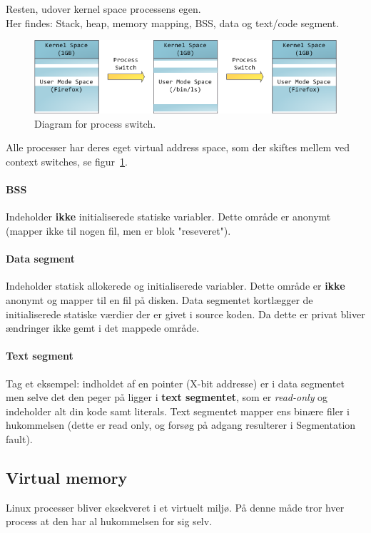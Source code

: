 Resten, udover kernel space processens egen.\\

Her findes: Stack, heap, memory mapping, BSS, data og text/code segment.

\begin{figure}[H]
	\centering
	\includegraphics[width=\linewidth]{figs/memoryspace}
	\caption{Diagram for process switch.}
	\label{fig:memoryspace}
\end{figure}

Alle processer har deres eget virtual address space, som der skiftes mellem ved context switches, se figur~\ref{fig:memoryspace}.

\paragraph{BSS}
Indeholder \textbf{ikke} initialiserede statiske variabler. Dette område er anonymt (mapper ikke til nogen fil, men er blok "reseveret").

\paragraph{Data segment}
Indeholder statisk allokerede og initialiserede variabler. Dette område er \textbf{ikke} anonymt og mapper til en fil på disken. Data segmentet kortlægger de initialiserede statiske værdier der er givet i source koden. Da dette er privat bliver ændringer ikke gemt i det mappede område.

\paragraph{Text segment}
Tag et eksempel: indholdet af en pointer (X-bit addresse) er i data segmentet men selve det den peger på ligger i \textbf{text segmentet}, som er \textit{read-only} og indeholder alt din kode samt literals. Text segmentet mapper ens binære filer i hukommelsen (dette er read only, og forsøg på adgang resulterer i Segmentation fault).

\subsection{Virtual memory}
Linux processer bliver eksekveret i et virtuelt miljø. På denne måde tror hver process at den har al hukommelsen for sig selv.\\

